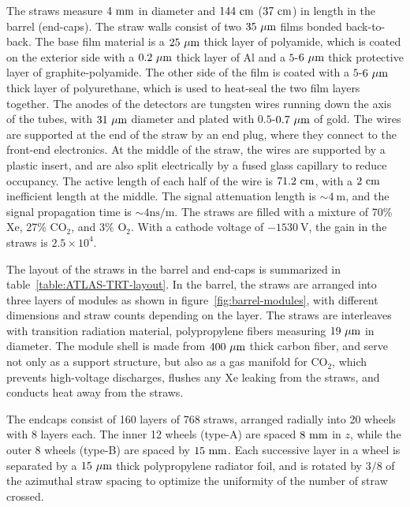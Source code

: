 The straws measure $4~\mathrm{mm}$ in diameter and $144~\mathrm{cm}$ ($37~\mathrm{cm}$) in length in the barrel (end-caps). The straw walls consist of two $35~\mu\mathrm{m}$ films bonded back-to-back. The base film material is a $25~\mu\mathrm{m}$ thick layer of polyamide, which is coated on the exterior side with a $0.2~\mu\mathrm{m}$ thick layer of Al and a $5$-$6~\mu\mathrm{m}$ thick protective layer of graphite-polyamide. The other side of the film is coated with a $5$-$6~\mu\mathrm{m}$ thick layer of polyurethane, which is used to heat-seal the two film layers together. The anodes of the detectors are tungsten wires running down the axis of the tubes, with $31~\mu\mathrm{m}$ diameter and plated with $0.5$-$0.7~\mu\mathrm{m}$ of gold. The wires are supported at the end of the straw by an end plug, where they connect to the front-end electronics. At the middle of the straw, the wires are supported by a plastic insert, and are also split electrically by a fused glass capillary to reduce occupancy. The active length of each half of the wire is $71.2~\mathrm{cm}$, with a $2~\mathrm{cm}$ inefficient length at the middle. The signal attenuation length is $\sim 4~\mbox{m}$, and the signal propagation time is $\sim 4 \mbox{ns}/\mbox{m}$. The straws are filled with a mixture of 70\% Xe, 27\% CO$_2$, and $3\%$ O$_2$. With a cathode voltage of $-1530~\mbox{V}$, the gain in the straws is $2.5\times 10^4$.

The layout of the straws in the barrel and end-caps is summarized in table~\ref{table:ATLAS-TRT-layout}. In the barrel, the straws are arranged into three layers of modules as shown in figure~\ref{fig:barrel-modules}, with different dimensions and straw counts depending on the layer. The straws are interleaves with transition radiation material, polypropylene fibers measuring $19~\mu\mathrm{m}$ in diameter. The module shell is made from $400~\mu\mathrm{m}$ thick carbon fiber, and serve not only as a support structure, but also as a gas manifold for CO$_2$, which prevents high-voltage discharges, flushes any Xe leaking from the straws, and conducts heat away from the straws.  

The endcaps consist of 160 layers of 768 straws, arranged radially into 20 wheels with 8 layers each. The inner 12 wheels (type-A) are spaced $8~\mathrm{mm}$ in $z$, while the outer 8 wheels (type-B) are spaced by $15~\mathrm{mm}$. Each successive layer in a wheel is separated by a $15~\mu\mathrm{m}$ thick polypropylene radiator foil, and is rotated by $3/8$ of the azimuthal straw spacing to optimize the uniformity of the number of straw crossed.


